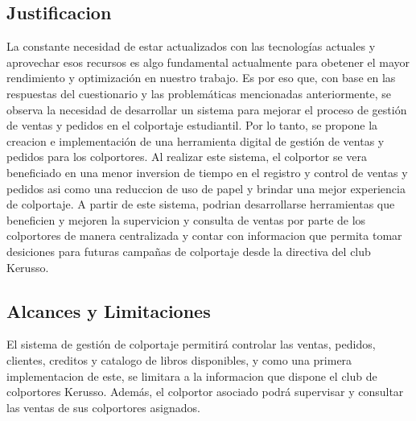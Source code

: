 \documentclass[runningheads]{llncs}
\begin{document}
        \subsection{Justificacion}
            La constante necesidad de estar actualizados con las tecnologías actuales y aprovechar esos recursos es algo fundamental actualmente para obetener el mayor rendimiento y optimización en nuestro trabajo. Es por eso que, con base en las respuestas del cuestionario y las problemáticas mencionadas anteriormente, se observa la necesidad de desarrollar un sistema para mejorar el proceso de gestión de ventas y pedidos en el colportaje estudiantil. Por lo tanto, se propone la creacion e implementación de una herramienta digital de gestión de ventas y pedidos para los colportores. Al realizar este sistema, el colportor se vera beneficiado en una menor inversion de tiempo en el registro y control de ventas y pedidos asi como una reduccion de uso de papel y brindar una mejor experiencia de colportaje. A partir de este sistema, podrian desarrollarse herramientas que beneficien y mejoren la supervicion y consulta de ventas por parte de los colportores de manera centralizada y contar con informacion que permita tomar desiciones para futuras campañas de colportaje desde la directiva del club Kerusso.

        \subsection{Alcances y Limitaciones}
            El sistema de gestión de colportaje permitirá controlar las ventas, pedidos, clientes, creditos y catalogo de libros disponibles, y como una primera implementacion de este, se limitara a la informacion que dispone el club de colportores Kerusso. Además, el colportor asociado podrá supervisar y consultar las ventas de sus colportores asignados.
\end{document}
